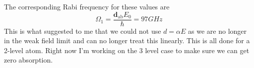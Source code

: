 \documentclass[twocolumn,english,pra,aps,superscriptaddress,floatfix]{revtex4-1}
\begin{document}
The corresponding Rabi frequency for these values are
\begin{equation}
\Omega_1=\frac{\mathbf{d}_{\mathrm{ab}}E_0}{\hbar}=97 GHz
\end{equation}
This is what suggested to me that we could not use $d=\alpha E$ as we are no longer in the weak field limit and can no longer treat this linearly. This is all done for a 2-level atom.  Right now I'm working on the 3 level case to make sure we can get zero absorption.
\end{document}
